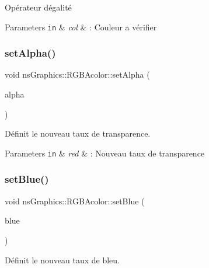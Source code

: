Opérateur d\textquotesingle{}égalité 


\begin{DoxyParams}[1]{Parameters}
\mbox{\tt in}  & {\em col} & \+: Couleur a vérifier \\
\hline
\end{DoxyParams}
\mbox{\label{classns_graphics_1_1_r_g_b_acolor_aa478d3c5b8b56f590a12461fe2ab4bbf}} 
\subsubsection{\texorpdfstring{set\+Alpha()}{setAlpha()}}
{\footnotesize\ttfamily void ns\+Graphics\+::\+R\+G\+B\+Acolor\+::set\+Alpha (\begin{DoxyParamCaption}\item[{const G\+Lubyte \&}]{alpha }\end{DoxyParamCaption})}



Définit le nouveau taux de transparence. 


\begin{DoxyParams}[1]{Parameters}
\mbox{\tt in}  & {\em red} & \+: Nouveau taux de transparence \\
\hline
\end{DoxyParams}
\mbox{\label{classns_graphics_1_1_r_g_b_acolor_ac6f522de2f51788d98846034174fb16a}} 
\subsubsection{\texorpdfstring{set\+Blue()}{setBlue()}}
{\footnotesize\ttfamily void ns\+Graphics\+::\+R\+G\+B\+Acolor\+::set\+Blue (\begin{DoxyParamCaption}\item[{const G\+Lubyte \&}]{blue }\end{DoxyParamCaption})}



Définit le nouveau taux de bleu. 


